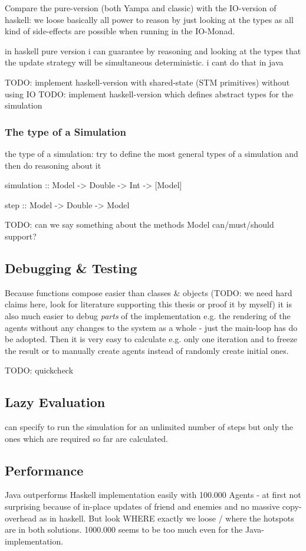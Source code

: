 Compare the pure-version (both Yampa and classic) with the IO-version of haskell: we loose basically all power to reason by just looking at the types as all kind of side-effects are possible when running in the IO-Monad.

in haskell pure version i can guarantee by reasoning and looking at the types that the update strategy will be simultaneous deterministic. i cant do that in java

TODO: implement haskell-version with shared-state (STM primitives) without using IO
TODO: implement haskell-version which defines abstract types for the simulation


\subsubsection{The type of a Simulation}
the type of a simulation: try to define the most general types of a simulation and then do reasoning about it

simulation :: Model -> Double -> Int -> [Model]

step :: Model -> Double -> Model

TODO: can we say something about the methods Model can/must/should support?

\subsection{Debugging \& Testing}
Because functions compose easier than classes \& objects (TODO: we need hard claims here, look for literature supporting this thesis or proof it by myself) it is also much easier to debug \textit{parts} of the implementation e.g. the rendering of the agents without any changes to the system as a whole - just the main-loop has do be adopted. Then it is very easy to calculate e.g. only one iteration and to freeze the result or to manually create agents instead of randomly create initial ones.

TODO: quickcheck \cite{claessen_quickcheck:_2000}


\subsection{Lazy Evaluation}
can specify to run the simulation for an unlimited number of steps but only the ones which are required so far are calculated.

\subsection{Performance}
Java outperforms Haskell implementation easily with 100.000 Agents - at first not surprising because of in-place updates of friend and enemies and no massive copy-overhead as in haskell. But look WHERE exactly we loose / where the hotspots are in both solutions. 1000.000 seems to be too much even for the Java-implementation.

